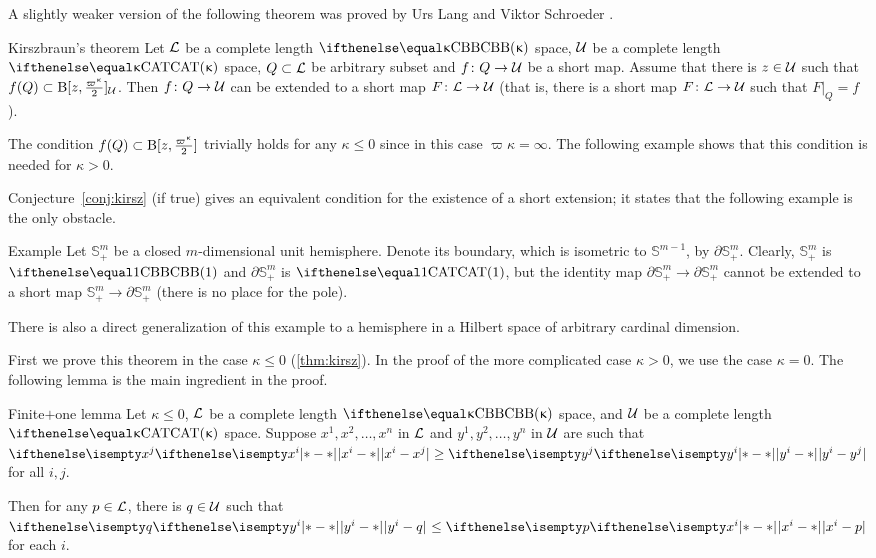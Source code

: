 A slightly weaker version of the following theorem was proved by Urs Lang and Viktor Schroeder \cite{lang-schroeder}.

\begin{thm}{Kirszbraun's theorem}
\label{thm:kirsz+}
Let
$\mathcal{L}$ be a complete length $\Alex{\kappa}$ space, 
$\mathcal{U}$ be a complete length $\CAT\kappa$ space, 
$Q\subset \spc{L}$ be arbitrary subset
and $f\: Q\to\spc{U}$ be a short map.
Assume that there is $z\in\spc{U}$ such that 
$f(Q)\subset \oBall[z,\tfrac{\varpi\kappa}{2}]_{\spc{U}}$.
Then $f\:Q\to\spc{U}$ can be extended to a short map 
$F\:\spc{L}\to \spc{U}$
(that is, there is a short map $F\:\spc{L}\to \spc{U}$ such that $F|_Q=f$).
\end{thm}
 
The condition $f(Q)\subset \oBall[z,\tfrac{\varpi\kappa}{2}]$ trivially holds for any $\kappa\le 0$ since in this case $\varpi\kappa=\infty$. 
The following example shows that this condition is needed for $\kappa>0$.

Conjecture~\ref{conj:kirsz} (if true) gives an equivalent condition for the existence of a short extension;
it states that the following example is the only obstacle.

\begin{thm}{Example}\label{example:SS_+}
Let $\mathbb{S}^m_+$ be a closed $m$-dimensional unit hemisphere. Denote its boundary, which is isometric to $\mathbb{S}^{m-1}$, by $\partial\mathbb{S}^m_+$.
Clearly, $\mathbb{S}^m_+$ is $\Alex{1}$ and $\partial\mathbb{S}^m_+$ is $\CAT1$, but the identity map ${\partial\mathbb{S}^m_+}\to \partial\mathbb{S}^m_+$ cannot be extended to a short map $\mathbb{S}^m_+\to \partial\mathbb{S}^m_+$ (there is no place for the pole).

There is also a direct generalization of this example to a hemisphere in a Hilbert space of arbitrary cardinal dimension.
\end{thm}

First we prove this theorem in the case $\kappa\le 0$ (\ref{thm:kirsz}).
In the proof of the more complicated case $\kappa>0$, we use the case $\kappa=0$.
The following lemma is the main ingredient in the proof. 

\begin{thm}{Finite$\bm{+}$one lemma}\label{lem:kirsz-neg:new}
Let $\kappa\le 0$,
$\mathcal{L}$ be a complete length $\Alex{\kappa}$ space, and 
$\mathcal{U}$ be a complete length $\CAT\kappa$ space.
Suppose
$x^1,x^2,\dots,x^n$ in $\mathcal{L}$ 
and $y^1,y^2,\dots,y^n$ in $\mathcal{U}$
are
such that $\dist{x^i}{x^j}{}\ge\dist{y^i}{y^j}{}$ for all $i,j$.

Then for any $p\in\spc{L}$, there is $q\in\spc{U}$ such that $\dist{y^i}{q}{}\le\dist{x^i}{p}{}$ for each $i$.
\end{thm}

